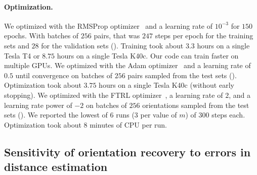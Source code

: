 \paragraph{Optimization.}
We optimized  with the RMSProp optimizer~\cite{tieleman2012rmsprop} and a learning rate of $10^{-3}$ for $150$ epochs.
With batches of $256$ pairs, that was $247$ steps per epoch for the training sets and $28$ for the validation sets ().
Training took about $3.3$ hours on a single Tesla T4 or $8.75$ hours on a single Tesla K40c. Our code can train faster on multiple GPUs.
We optimized  with the Adam optimizer~\cite{kingma2014adam} and a learning rate of $0.5$ until convergence on batches of $256$ pairs sampled from the test sets ().
Optimization took about $3.75$ hours on a single Tesla K40c (without early stopping).
We optimized  with the FTRL optimizer~\cite{mcmahan2013ftrl}, a learning rate of $2$, and a learning rate power of $-2$ on batches of $256$ orientations sampled from the test sets ().
We reported the lowest of 6 runs (3 per value of $m$) of 300 steps each.
Optimization took about 8 minutes of CPU per run.


\subsection{Sensitivity of orientation recovery to errors in distance estimation}\label{sec:results:orientation-recovery:sensitivity}


